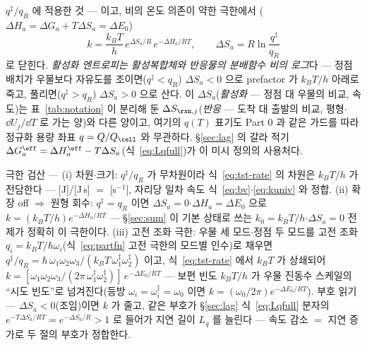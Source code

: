 \begin{bgbox}
$q^\ddagger/q_R$ 에 적용한 것 --- 이고, 비의 온도 의존이 약한 극한에서
($\Delta H_a=\Delta G_a+T\Delta S_a=\Delta E_0$)
\begin{equation}
\boxed{\;k=\frac{k_BT}{h}\,e^{\Delta S_a/R}\,e^{-\Delta H_a/RT},
\qquad \Delta S_a=R\ln\frac{q^\ddagger}{q_R}\;}
\label{eq:tst-entropy}
\end{equation}
로 닫힌다. \emph{활성화 엔트로피는 활성복합체와 반응물의 분배함수 비의 로그}다 --- 정점 배치가
우물보다 자유도를 조이면($q^\ddagger<q_R$) $\Delta S_a<0$ 으로 prefactor 가 $k_BT/h$ 아래로
죽고, 풀리면($q^\ddagger>q_R$) $\Delta S_a>0$ 으로 산다. 이 $\Delta S_a$(\emph{활성화} --- 정점
대 우물의 비교, 속도)는 표~\ref{tab:notation} 이 분리해 둔 $\Delta S_{\rxn,j}$(\emph{반응} ---
도착 대 출발의 비교, 평형$\cdot$$\dd U_j/\dd T$ 로 가는 양)와 다른 양이고, 여기의 $q(T)$ 표기도
Part 0 과 같은 가드를 따라 정규화 용량 좌표 $q=Q/Q_\cell$ 와 무관하다. \S\ref{sec:lag} 의 갈라
적기 $\Delta G_a^\eff=\Delta H_a^\eff-T\Delta S_a$(식~\eqref{eq:Lqfull})가 이 미시 정의의
사용처다.
\end{bgbox}

\begin{verifybox}
극한 검산 --- (i) 차원$\cdot$크기: $q^\ddagger/q_R$ 가 무차원이라 식~\eqref{eq:tst-rate} 의
차원은 $k_BT/h$ 가 전담한다 --- [J]/[J$\,$s] $=$ [s$^{-1}$], 자리당 일차 속도
식~\eqref{eq:bv}$\cdot$\eqref{eq:kuniv} 와 정합. (ii) 확장 off $\Rightarrow$ 원형 회수:
$q^\ddagger=q_R$ 이면 $\Delta S_a=0$$\cdot$$\Delta H_a=\Delta E_0$ 으로
$k=(k_BT/h)e^{-\Delta H_a/RT}$ --- \S\ref{sec:sum} 이 기본 상태로 쓰는
$k_0=k_BT/h$$\cdot$$\Delta S_a{=}0$ 전제가 정확히 이 극한이다. (iii) 고전 조화 극한: 우물 세
모드$\cdot$정점 두 모드를 고전 조화 $q_i=k_BT/\hbar\omega_i$(식~\eqref{eq:partfn} 고전 극한의
모드별 인수)로 채우면 $q^\ddagger/q_R=\hbar\,\omega_1\omega_2\omega_3/(k_BT\,
\omega_1^\ddagger\omega_2^\ddagger)$ 이고, 식~\eqref{eq:tst-rate} 에서 $k_BT$ 가 상쇄되어
$k=[\omega_1\omega_2\omega_3/(2\pi\,\omega_1^\ddagger\omega_2^\ddagger)]\,e^{-\Delta E_0/RT}$
--- 보편 빈도 $k_BT/h$ 가 우물 진동수 스케일의 ``시도 빈도''로 넘겨진다(등방
$\omega_i=\omega_i^\ddagger=\omega_0$ 이면 $k=(\omega_0/2\pi)e^{-\Delta E_0/RT}$). 부호 읽기 ---
$\Delta S_a<0$(조임)이면 $k$ 가 줄고, 같은 부호가 \S\ref{sec:lag} 식~\eqref{eq:Lqfull} 분자의
$e^{-T\Delta S_a/RT}=e^{-\Delta S_a/R}>1$ 로 들어가 지연 길이 $L_q$ 를 늘린다 --- 속도 감소
$=$ 지연 증가로 두 절의 부호가 정합한다.
\end{verifybox}


